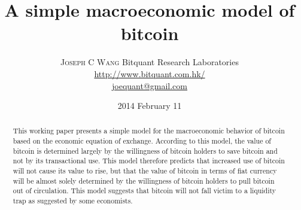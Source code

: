 \documentclass[twoside]{article}
\title{\vspace{-15mm}\fontsize{24pt}{10pt}\selectfont\textbf{A simple macroeconomic model of bitcoin}} %
\author{
\large
\textsc{Joseph C Wang}
\normalsize Bitquant Research Laboratories\\
\normalsize \href{http://www.bitquant.com.hk/}{http://www.bitquant.com.hk/} \\
\normalsize \href{mailto:joequant@gmail.com}{joequant@gmail.com} \\
\date{2014 February 11}
}
\begin{document}
\maketitle
\thispagestyle{fancy}
\begin{abstract}
This working paper presents a simple model for the macroeconomic
behavior of bitcoin based on the economic equation of exchange.
According to this model, the value of bitcoin is determined largely by
the willingness of bitcoin holders to save bitcoin and not by its
transactional use.  This model therefore predicts that increased use
of bitcoin will not cause its value to rise, but that the value of
bitcoin in terms of fiat currency will be almost solely determined by
the willingness of bitcoin holders to pull bitcoin out of circulation.
This model suggests that bitcoin will not fall victim to a liquidity
trap as suggested by some economists.
\end{abstract}
\end{document}
